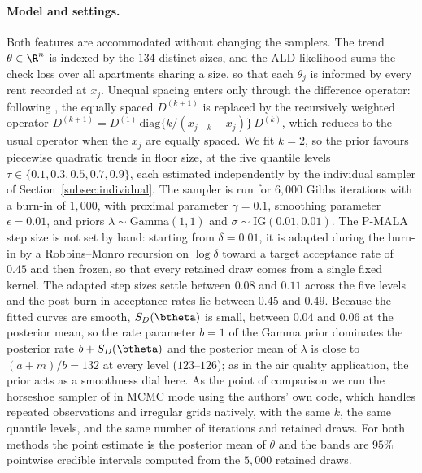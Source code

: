 \paragraph{Model and settings.} Both features are accommodated without changing the samplers. The trend $\theta \in \R^{n}$ is indexed by the $134$ distinct sizes, and the ALD likelihood sums the check loss over all apartments sharing a size, so that each $\theta_j$ is informed by every rent recorded at $x_j$. Unequal spacing enters only through the difference operator: following \citet{onizuka2024fast}, the equally spaced $D^{(k+1)}$ is replaced by the recursively weighted operator $D^{(k+1)} = D^{(1)}\,\mathrm{diag}\{k/(x_{j+k} - x_j)\}\,D^{(k)}$, which reduces to the usual operator when the $x_j$ are equally spaced. We fit $k = 2$, so the prior favours piecewise quadratic trends in floor size, at the five quantile levels $\tau \in \{0.1, 0.3, 0.5, 0.7, 0.9\}$, each estimated independently by the individual sampler of Section~\ref{subsec:individual}. The sampler is run for $6{,}000$ Gibbs iterations with a burn-in of $1{,}000$, with proximal parameter $\gamma = 0.1$, smoothing parameter $\epsilon = 0.01$, and priors $\lambda \sim \mathrm{Gamma}(1,1)$ and $\sigma \sim \mathrm{IG}(0.01, 0.01)$. The P-MALA step size is not set by hand: starting from $\delta = 0.01$, it is adapted during the burn-in by a Robbins--Monro recursion on $\log\delta$ toward a target acceptance rate of $0.45$ and then frozen, so that every retained draw comes from a single fixed kernel. The adapted step sizes settle between $0.08$ and $0.11$ across the five levels and the post-burn-in acceptance rates lie between $0.45$ and $0.49$. Because the fitted curves are smooth, $S_{D}(\btheta)$ is small, between $0.04$ and $0.06$ at the posterior mean, so the rate parameter $b = 1$ of the Gamma prior dominates the posterior rate $b + S_{D}(\btheta)$ and the posterior mean of $\lambda$ is close to $(a + m)/b = 132$ at every level ($123$--$126$); as in the air quality application, the prior acts as a smoothness dial here. As the point of comparison we run the horseshoe sampler of \citet{onizuka2024fast} in MCMC mode using the authors' own code, which handles repeated observations and irregular grids natively, with the same $k$, the same quantile levels, and the same number of iterations and retained draws. For both methods the point estimate is the posterior mean of $\theta$ and the bands are $95\%$ pointwise credible intervals computed from the $5{,}000$ retained draws.

